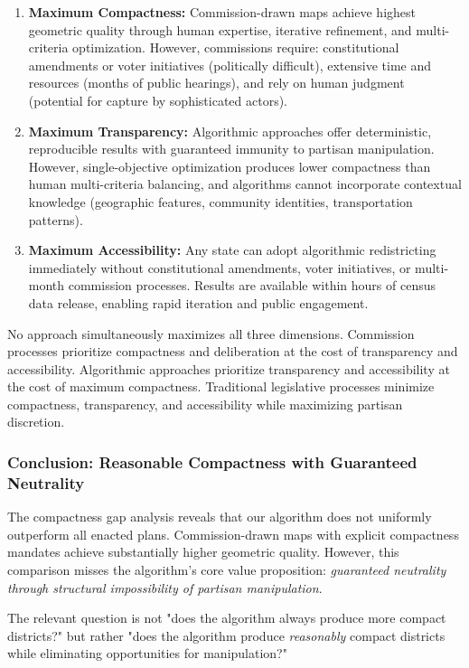 \begin{enumerate}
\item \textbf{Maximum Compactness:} Commission-drawn maps achieve highest geometric quality through human expertise, iterative refinement, and multi-criteria optimization. However, commissions require: constitutional amendments or voter initiatives (politically difficult), extensive time and resources (months of public hearings), and rely on human judgment (potential for capture by sophisticated actors).

\item \textbf{Maximum Transparency:} Algorithmic approaches offer deterministic, reproducible results with guaranteed immunity to partisan manipulation. However, single-objective optimization produces lower compactness than human multi-criteria balancing, and algorithms cannot incorporate contextual knowledge (geographic features, community identities, transportation patterns).

\item \textbf{Maximum Accessibility:} Any state can adopt algorithmic redistricting immediately without constitutional amendments, voter initiatives, or multi-month commission processes. Results are available within hours of census data release, enabling rapid iteration and public engagement.
\end{enumerate}

No approach simultaneously maximizes all three dimensions. Commission processes prioritize compactness and deliberation at the cost of transparency and accessibility. Algorithmic approaches prioritize transparency and accessibility at the cost of maximum compactness. Traditional legislative processes minimize compactness, transparency, and accessibility while maximizing partisan discretion.

\subsubsection{Conclusion: Reasonable Compactness with Guaranteed Neutrality}

The compactness gap analysis reveals that our algorithm does not uniformly outperform all enacted plans. Commission-drawn maps with explicit compactness mandates achieve substantially higher geometric quality. However, this comparison misses the algorithm's core value proposition: \textit{guaranteed neutrality through structural impossibility of partisan manipulation}.

The relevant question is not "does the algorithm always produce more compact districts?" but rather "does the algorithm produce \textit{reasonably} compact districts while eliminating opportunities for manipulation?"

